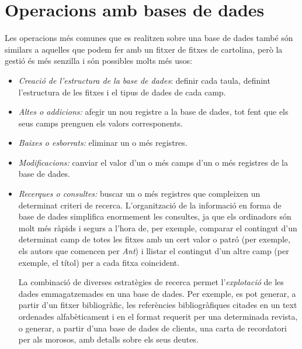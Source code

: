 \section{Operacions amb bases de dades}

Les operacions més comunes que es realitzen sobre una base de dades
també són similars a aquelles que podem fer amb un fitxer de fitxes de
cartolina, però la gestió és més senzilla i són possibles molts més
usos:
\begin{itemize}
\item \emph{Creació de l'estructura de la base de dades}: definir cada
  taula, definint l'estructura de les fitxes i el tipus de dades de
  cada camp.
\item \emph{Altes o addicions:} afegir un nou registre a la base de
  dades, tot fent que els seus camps prenguen els valors
  corresponents.
\item \emph{Baixes o esborrats:} eliminar un o més registres.
\item \emph{Modificacions:} canviar el valor d'un o més camps d'un o
  més registres de la base de dades.
\item \emph{Recerques o consultes:} buscar un o més registres que
  compleixen un determinat criteri de recerca. L'organització de la
  informació en forma de base de dades simplifica enormement les
  consultes, ja que els ordinadors són molt més ràpids i segurs a
  l'hora de, per exemple, comparar el contingut d'un determinat camp
  de totes les fitxes amb un cert valor o patró (per exemple, els
  autors que comencen per \emph{Ant}) i llistar el contingut d'un
  altre camp (per exemple, el títol) per a cada fitxa coincident. 

  La combinació de diverses estratègies de recerca permet
  l'\emph{explotació} de les dades emmagatzemades en una base de
  dades. Per exemple, es pot generar, a partir d'un fitxer
  bibliogràfic, les referències bibliogràfiques citades en un text
  ordenades alfabèticament i en el format requerit per una determinada
  revista, o generar, a partir d'una base de dades de clients, una
  carta de recordatori per als morosos, amb detalls sobre els seus
  deutes.
\end{itemize}
